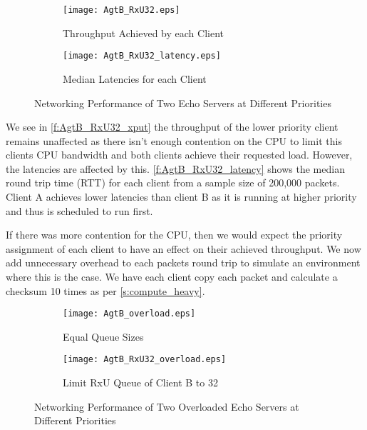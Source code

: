 \noindent\begin{figure}[h]
    \centering
	\begin{multicols}{2}
		\begin{subfigure}[b]{0.45\textwidth}
        \centering
        \texttt{[image: AgtB\_RxU32.eps]}
        \caption{Throughput Achieved by each Client}
        \label{f:AgtB_RxU32_xput}
    \end{subfigure}\qquad
    \begin{subfigure}[b]{0.45\textwidth}
        \vspace{39pt}
        \centering
        \texttt{[image: AgtB\_RxU32\_latency.eps]}
        \caption{Median Latencies for each Client}
        \label{f:AgtB_RxU32_latency}
    \end{subfigure}
\end{multicols}
\caption{Networking Performance of Two Echo Servers at Different Priorities}
\label{f:AgtB_RxU32}
\end{figure}

We see in \autoref{f:AgtB_RxU32_xput} the throughput of the lower priority client remains unaffected as there isn't enough
contention on the CPU to limit this clients CPU bandwidth and both clients achieve their requested load.
However, the latencies are affected by this. \autoref{f:AgtB_RxU32_latency} shows the median round trip time (RTT)
for each client from a sample size of 200,000 packets. Client A achieves lower latencies than client B as it is running
at higher priority and thus is scheduled to run first.

If there was more contention for the CPU, then we would expect the priority assignment of each client to have an effect
on their achieved throughput. We now add unnecessary overhead to each packets round trip to simulate an environment where
this is the case. We have each client copy each packet and calculate a checksum 10 times as per \autoref{s:compute_heavy}. 

\noindent\begin{figure}[h]
    \centering
	\begin{multicols}{2}
		\begin{subfigure}[b]{0.45\textwidth}
        \centering
        \texttt{[image: AgtB\_overload.eps]}
        \caption{Equal Queue Sizes}
        \label{f:AgtB_overload}
    \end{subfigure}\qquad
    \begin{subfigure}[b]{0.45\textwidth}
        \centering
        \texttt{[image: AgtB\_RxU32\_overload.eps]}
        \caption{Limit RxU Queue of Client B to 32}
        \label{f:AgtB_RxU32_overload}
    \end{subfigure}
\end{multicols}
\caption{Networking Performance of Two Overloaded Echo Servers at Different Priorities}
\label{f:AgtB_od}
\end{figure}

